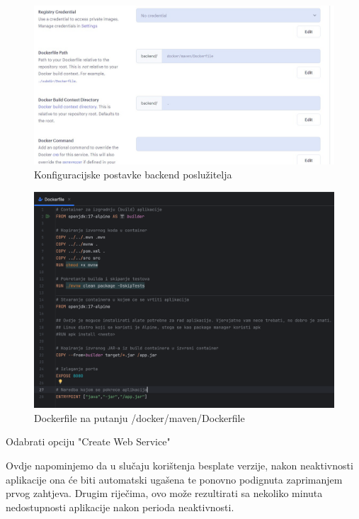 \begin{packed_enum}
				\begin{figure}[H]
					\includegraphics[scale=0.4]{deploy/backendConf.jpeg}
					\centering
					\caption{Konfiguracijske postavke backend poslužitelja}
					\label{fig:promjene}
				\end{figure}
				
				\begin{figure}[H]
					\includegraphics[scale=0.45]{deploy/dockerFile.png}
					\centering
					\caption{Dockerfile na putanju /docker/maven/Dockerfile}
					\label{fig:promjene}
				\end{figure}
				
				\item 	Odabrati opciju "Create Web Service"
				
				Ovdje napominjemo da u slučaju korištenja besplate verzije, nakon neaktivnosti aplikacije ona će biti automatski ugašena te ponovno podignuta zaprimanjem prvog zahtjeva. Drugim riječima, ovo može rezultirati sa nekoliko minuta nedostupnosti aplikacije nakon perioda neaktivnosti.
				
			\end{packed_enum}



